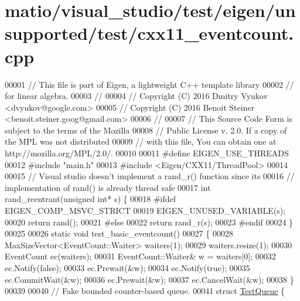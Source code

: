 \hypertarget{matio_2visual__studio_2test_2eigen_2unsupported_2test_2cxx11__eventcount_8cpp_source}{}\section{matio/visual\+\_\+studio/test/eigen/unsupported/test/cxx11\+\_\+eventcount.cpp}
\label{matio_2visual__studio_2test_2eigen_2unsupported_2test_2cxx11__eventcount_8cpp_source}

\begin{DoxyCode}
00001 \textcolor{comment}{// This file is part of Eigen, a lightweight C++ template library}
00002 \textcolor{comment}{// for linear algebra.}
00003 \textcolor{comment}{//}
00004 \textcolor{comment}{// Copyright (C) 2016 Dmitry Vyukov <dvyukov@google.com>}
00005 \textcolor{comment}{// Copyright (C) 2016 Benoit Steiner <benoit.steiner.goog@gmail.com>}
00006 \textcolor{comment}{//}
00007 \textcolor{comment}{// This Source Code Form is subject to the terms of the Mozilla}
00008 \textcolor{comment}{// Public License v. 2.0. If a copy of the MPL was not distributed}
00009 \textcolor{comment}{// with this file, You can obtain one at http://mozilla.org/MPL/2.0/.}
00010 
00011 \textcolor{preprocessor}{#define EIGEN\_USE\_THREADS}
00012 \textcolor{preprocessor}{#include "main.h"}
00013 \textcolor{preprocessor}{#include <Eigen/CXX11/ThreadPool>}
00014 
00015 \textcolor{comment}{// Visual studio doesn't implement a rand\_r() function since its}
00016 \textcolor{comment}{// implementation of rand() is already thread safe}
00017 \textcolor{keywordtype}{int} rand\_reentrant(\textcolor{keywordtype}{unsigned} \textcolor{keywordtype}{int}* s) \{
00018 \textcolor{preprocessor}{#ifdef EIGEN\_COMP\_MSVC\_STRICT}
00019   EIGEN\_UNUSED\_VARIABLE(s);
00020   \textcolor{keywordflow}{return} rand();
00021 \textcolor{preprocessor}{#else}
00022   \textcolor{keywordflow}{return} rand\_r(s);
00023 \textcolor{preprocessor}{#endif}
00024 \}
00025 
00026 \textcolor{keyword}{static} \textcolor{keywordtype}{void} test\_basic\_eventcount()
00027 \{
00028   MaxSizeVector<EventCount::Waiter> waiters(1);
00029   waiters.resize(1);
00030   EventCount ec(waiters);
00031   EventCount::Waiter& w = waiters[0];
00032   ec.Notify(\textcolor{keyword}{false});
00033   ec.Prewait(&w);
00034   ec.Notify(\textcolor{keyword}{true});
00035   ec.CommitWait(&w);
00036   ec.Prewait(&w);
00037   ec.CancelWait(&w);
00038 \}
00039 
00040 \textcolor{comment}{// Fake bounded counter-based queue.}
00041 \textcolor{keyword}{struct }\hyperlink{struct_test_queue}{TestQueue} \{

\end{DoxyCode}
